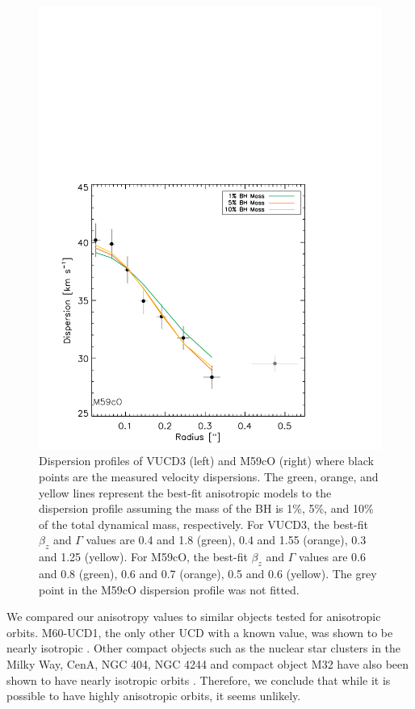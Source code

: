\documentclass{aastex}
\begin{document}
\begin{figure}[ht!]
\begin{minipage}{0.48\textwidth}
    \includegraphics[trim={0 0 0 10cm},clip,scale=0.5]{m59co_onedanisotropy.pdf}%
  \end{minipage}
    
  \caption{Dispersion profiles of VUCD3 (left) and M59cO (right) where black points are the measured velocity dispersions. The green, orange, and yellow lines represent the best-fit anisotropic models to the dispersion profile assuming the mass of the BH is 1\%, 5\%, and 10\% of the total dynamical mass, respectively. For VUCD3, the best-fit $\beta_z$ and $\Gamma$ values are 0.4 and 1.8 (green), 0.4 and 1.55 (orange), 0.3 and 1.25 (yellow). For M59cO, the best-fit $\beta_z$ and $\Gamma$ values are 0.6 and 0.8 (green), 0.6 and 0.7 (orange), 0.5 and 0.6 (yellow). The grey point in the M59cO dispersion profile was not fitted.}
  
  \label{fig:onedanis}

\end{figure}

We compared our anisotropy values to similar objects tested for anisotropic orbits. M60-UCD1, the only other UCD with a known value, was shown to be nearly isotropic \citep{seth14}. Other compact objects such as the nuclear star clusters in the Milky Way, CenA, NGC 404, NGC 4244 and compact object M32 have also been shown to have nearly isotropic orbits \citep{schodel09,verolme02,cappellari09,hartmann11,nguyen16}. Therefore, we conclude that while it is possible to have highly anisotropic orbits, it seems unlikely.
\end{document}
